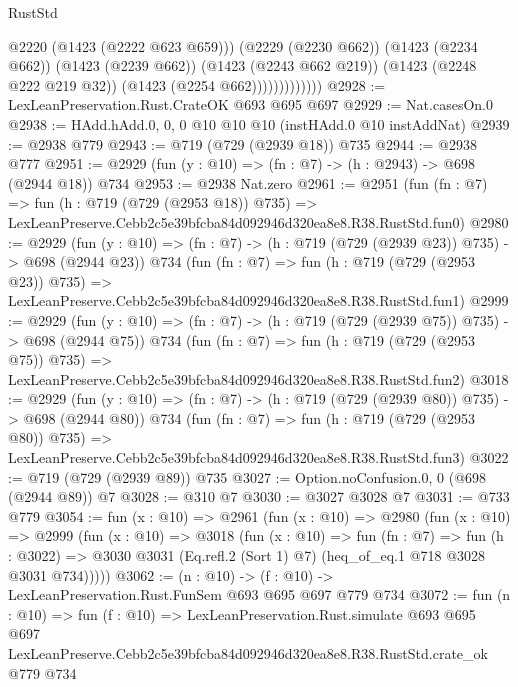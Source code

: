 \begin{lexlean}{RustStd}
\begin{coremodule}
                            @2220
                            (@1423 (@2222 @623 @659)))
                          (@2229 (@2230 @662))
                          (@1423 (@2234 @662))
                          (@1423 (@2239 @662))
                          (@1423 (@2243 @662 @219))
                          (@1423 (@2248 @222 @219 @32))
                          (@1423 (@2254 @662)))))))))))))
@2928 := LexLeanPreservation.Rust.CrateOK @693 @695 @697
@2929 := Nat.casesOn.{0}
@2938 := HAdd.hAdd.{0, 0, 0} @10 @10 @10 (instHAdd.{0} @10 instAddNat)
@2939 := @2938 @779
@2943 := @719 (@729 (@2939 @18)) @735
@2944 := @2938 @777
@2951 := @2929 (fun (y : @10) => (fn : @7) -> (h : @2943) -> @698 (@2944 @18)) @734
@2953 := @2938 Nat.zero
@2961 := @2951
    (fun (fn : @7) =>
    fun (h : @719 (@729 (@2953 @18)) @735) =>
    LexLeanPreserve.Cebb2c5e39bfcba84d092946d320ea8e8.R38.RustStd.fun0)
@2980 := @2929
    (fun (y : @10) => (fn : @7) -> (h : @719 (@729 (@2939 @23)) @735) -> @698 (@2944 @23))
    @734
    (fun (fn : @7) =>
    fun (h : @719 (@729 (@2953 @23)) @735) =>
    LexLeanPreserve.Cebb2c5e39bfcba84d092946d320ea8e8.R38.RustStd.fun1)
@2999 := @2929
    (fun (y : @10) => (fn : @7) -> (h : @719 (@729 (@2939 @75)) @735) -> @698 (@2944 @75))
    @734
    (fun (fn : @7) =>
    fun (h : @719 (@729 (@2953 @75)) @735) =>
    LexLeanPreserve.Cebb2c5e39bfcba84d092946d320ea8e8.R38.RustStd.fun2)
@3018 := @2929
    (fun (y : @10) => (fn : @7) -> (h : @719 (@729 (@2939 @80)) @735) -> @698 (@2944 @80))
    @734
    (fun (fn : @7) =>
    fun (h : @719 (@729 (@2953 @80)) @735) =>
    LexLeanPreserve.Cebb2c5e39bfcba84d092946d320ea8e8.R38.RustStd.fun3)
@3022 := @719 (@729 (@2939 @89)) @735
@3027 := Option.noConfusion.{0, 0} (@698 (@2944 @89)) @7
@3028 := @310 @7
@3030 := @3027 @3028 @7
@3031 := @733 @779
@3054 := fun (x : @10) =>
  @2961
    (fun (x : @10) =>
    @2980
      (fun (x : @10) =>
      @2999
        (fun (x : @10) =>
        @3018
          (fun (x : @10) =>
          fun (fn : @7) =>
          fun (h : @3022) =>
          @3030 @3031 (Eq.refl.{2} (Sort 1) @7) (heq_of_eq.{1} @718 @3028 @3031 @734)))))
@3062 := (n : @10) -> (f : @10) -> LexLeanPreservation.Rust.FunSem @693 @695 @697 @779 @734
@3072 := fun (n : @10) =>
  fun (f : @10) =>
  LexLeanPreservation.Rust.simulate
    @693
    @695
    @697
    LexLeanPreserve.Cebb2c5e39bfcba84d092946d320ea8e8.R38.RustStd.crate_ok
    @779
    @734
\end{coremodule}
\end{lexlean}

